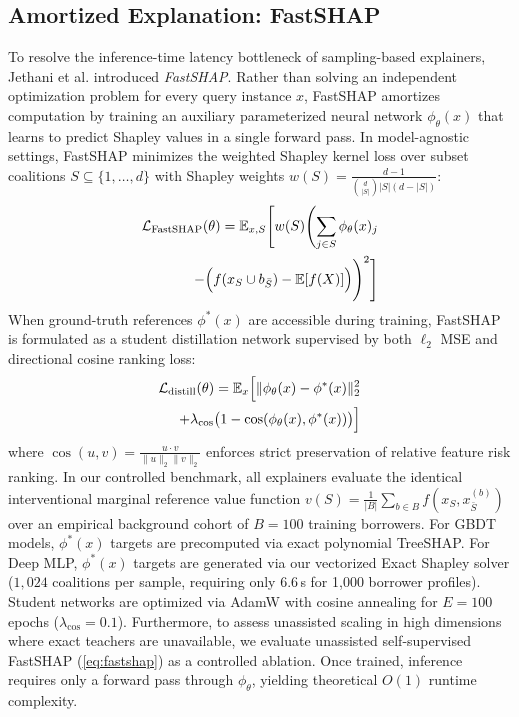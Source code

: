 \documentclass[conference]{IEEEtran}
\begin{document}
\subsection{Amortized Explanation: FastSHAP}
To resolve the inference-time latency bottleneck of sampling-based explainers, Jethani et al. \cite{jethani2022fastshap} introduced \textit{FastSHAP}. Rather than solving an independent optimization problem for every query instance $x$, FastSHAP amortizes computation by training an auxiliary parameterized neural network $\phi_\theta(x)$ that learns to predict Shapley values in a single forward pass. In model-agnostic settings, FastSHAP minimizes the weighted Shapley kernel loss over subset coalitions $S \subseteq \{1, \dots, d\}$ with Shapley weights $w(S) = \frac{d - 1}{\binom{d}{|S|} |S| (d - |S|)}$:
\begin{equation}
\begin{split}
\mathcal{L}_{\text{FastSHAP}}(\theta) = \mathbb{E}_{x, S} \Biggl[ w(S) \Biggl( \sum_{j \in S} \phi_\theta(x)_j \\
- \Bigl( f(x_S \cup b_{\bar{S}}) - \mathbb{E}[f(X)] \Bigr) \Biggr)^2 \Biggr]
\end{split}
\label{eq:fastshap}
\end{equation}
When ground-truth references $\phi^*(x)$ are accessible during training, FastSHAP is formulated as a student distillation network supervised by both $\ell_2$ MSE and directional cosine ranking loss:
\begin{equation}
\begin{split}
\mathcal{L}_{\text{distill}}(\theta) = \mathbb{E}_{x} \Bigl[ \|\phi_\theta(x) - \phi^*(x)\|_2^2 \\
+ \lambda_{\text{cos}} \bigl(1 - \cos(\phi_\theta(x), \phi^*(x))\bigr) \Bigr]
\end{split}
\label{eq:fastshap_distill}
\end{equation}
where $\cos(u, v) = \frac{u \cdot v}{\|u\|_2 \|v\|_2}$ enforces strict preservation of relative feature risk ranking. In our controlled benchmark, all explainers evaluate the identical interventional marginal reference value function $v(S) = \frac{1}{|B|} \sum_{b \in B} f(x_S, x^{(b)}_{\bar{S}})$ over an empirical background cohort of $B=100$ training borrowers. For GBDT models, $\phi^*(x)$ targets are precomputed via exact polynomial TreeSHAP. For Deep MLP, $\phi^*(x)$ targets are generated via our vectorized Exact Shapley solver ($1,024$ coalitions per sample, requiring only $6.6$\,s for 1,000 borrower profiles). Student networks are optimized via AdamW with cosine annealing for $E = 100$ epochs ($\lambda_{\text{cos}} = 0.1$). Furthermore, to assess unassisted scaling in high dimensions where exact teachers are unavailable, we evaluate unassisted self-supervised FastSHAP (\ref{eq:fastshap}) as a controlled ablation. Once trained, inference requires only a forward pass through $\phi_\theta$, yielding theoretical $O(1)$ runtime complexity.
\end{document}
